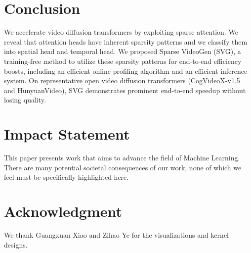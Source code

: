 \section{Conclusion}
We accelerate video diffusion transformers by exploiting sparse attention. We reveal that attention heads have inherent sparsity patterns and we classify them into spatial head and temporal head. We proposed Sparse VideoGen (SVG), a training-free method to utilize these sparsity patterns for end-to-end efficiency boosts, including an efficient online profiling algorithm and an efficient inference system. On representative open video diffusion transformers (CogVideoX-v1.5 and HunyuanVideo), SVG demonstrates prominent end-to-end speedup without losing quality. 



\section*{Impact Statement}
This paper presents work that aims to advance the field of Machine Learning. There are many potential societal consequences of our work, none of which we feel must be specifically highlighted here.

\section*{Acknowledgment}
We thank Guangxuan Xiao and Zihao Ye for the visualizations and kernel designs.
